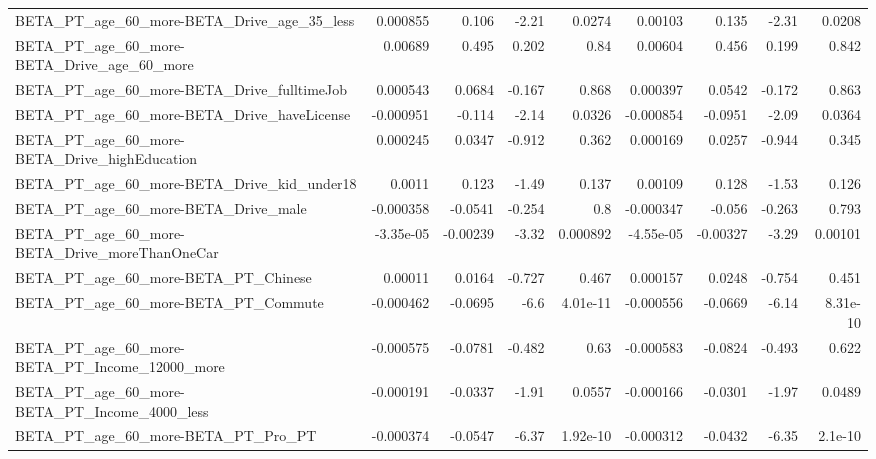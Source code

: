 \begin{tabular}{lrrrrrrrr}
BETA\_PT\_age\_60\_more-BETA\_Drive\_age\_35\_less         &    0.000855 &        0.106 &     -2.21 &   0.0274 &    0.00103 &       0.135 &        -2.31 &        0.0208 \\
BETA\_PT\_age\_60\_more-BETA\_Drive\_age\_60\_more         &     0.00689 &        0.495 &     0.202 &     0.84 &    0.00604 &       0.456 &        0.199 &         0.842 \\
BETA\_PT\_age\_60\_more-BETA\_Drive\_fulltimeJob         &    0.000543 &       0.0684 &    -0.167 &    0.868 &   0.000397 &      0.0542 &       -0.172 &         0.863 \\
BETA\_PT\_age\_60\_more-BETA\_Drive\_haveLicense         &   -0.000951 &       -0.114 &     -2.14 &   0.0326 &  -0.000854 &     -0.0951 &        -2.09 &        0.0364 \\
BETA\_PT\_age\_60\_more-BETA\_Drive\_highEducation       &    0.000245 &       0.0347 &    -0.912 &    0.362 &   0.000169 &      0.0257 &       -0.944 &         0.345 \\
BETA\_PT\_age\_60\_more-BETA\_Drive\_kid\_under18         &      0.0011 &        0.123 &     -1.49 &    0.137 &    0.00109 &       0.128 &        -1.53 &         0.126 \\
BETA\_PT\_age\_60\_more-BETA\_Drive\_male                &   -0.000358 &      -0.0541 &    -0.254 &      0.8 &  -0.000347 &      -0.056 &       -0.263 &         0.793 \\
BETA\_PT\_age\_60\_more-BETA\_Drive\_moreThanOneCar      &   -3.35e-05 &     -0.00239 &     -3.32 & 0.000892 &  -4.55e-05 &    -0.00327 &        -3.29 &       0.00101 \\
BETA\_PT\_age\_60\_more-BETA\_PT\_Chinese                &     0.00011 &       0.0164 &    -0.727 &    0.467 &   0.000157 &      0.0248 &       -0.754 &         0.451 \\
BETA\_PT\_age\_60\_more-BETA\_PT\_Commute                &   -0.000462 &      -0.0695 &      -6.6 & 4.01e-11 &  -0.000556 &     -0.0669 &        -6.14 &      8.31e-10 \\
BETA\_PT\_age\_60\_more-BETA\_PT\_Income\_12000\_more      &   -0.000575 &      -0.0781 &    -0.482 &     0.63 &  -0.000583 &     -0.0824 &       -0.493 &         0.622 \\
BETA\_PT\_age\_60\_more-BETA\_PT\_Income\_4000\_less       &   -0.000191 &      -0.0337 &     -1.91 &   0.0557 &  -0.000166 &     -0.0301 &        -1.97 &        0.0489 \\
BETA\_PT\_age\_60\_more-BETA\_PT\_Pro\_PT                 &   -0.000374 &      -0.0547 &     -6.37 & 1.92e-10 &  -0.000312 &     -0.0432 &        -6.35 &       2.1e-10 \\

\end{tabular}
